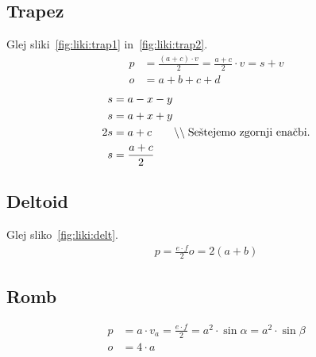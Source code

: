 \documentclass[a4paper,oneside,12pt,fleqn]{article}
\newcommand\krat\cdot
\newcommand{\comment}[1]{\ensuremath{\qquad\backslash\backslash\;}\textnormal{#1}}
\numberwithin{equation}{section}
\begin{document}
\parbox[t]{0.5\textwidth}{
\subsection{Trapez}
\label{sec:liki:trap}
Glej sliki~\ref{fig:liki:trap1} in~\ref{fig:liki:trap2}.
\begin{align*}
  p &=  \frac{(a+c)\krat v}{2} = \frac{a+c}{2} \krat v = s + v \\ 
  o &=  a + b + c + d 
\end{align*}
\begin{align*}
  s &=  a - x - y \\
  s &=  a + x + y \\
   2s &=  a+c \comment{Seštejemo zgornji enačbi.}\\
  s &= \frac{a+c}{2}
\end{align*}

\subsection{Deltoid}
\label{sec:liki:delt}
Glej sliko~\ref{fig:liki:delt}.
\begin{align*}
  p = \frac{e\krat f}{2}
  o = 2(a+b)
\end{align*}

\subsection{Romb}
\label{sec:liki:romb}
\begin{align*}
  p &=  a\krat v_a = \frac{e\krat f}{2} = a^2\krat\sin\alpha = a^2\krat\sin\beta \\
  o &=  4\krat a 
\end{align*}
}
\end{document}
